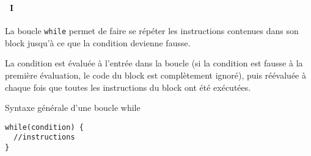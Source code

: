 \begin{frame}[containsverbatim]
  \frametitle{\secname}
  \framesubtitle{\subsecname~I}

  La boucle \verb|while| permet de faire se répéter les instructions contenues dans son block jusqu'à ce que la condition devienne fausse.
  \vspace{0.5cm}
  \par
  La condition est évaluée à l'entrée dans la boucle (si la condition est fausse à la première évaluation, le code du block est complètement ignoré), puis réévaluée
  à chaque fois que toutes les instructions du block ont été exécutées.
  \vspace{0.5cm}
  \begin{block}{Syntaxe générale d'une boucle while}
    \begin{verbatim}
while(condition) {
  //instructions
}\end{verbatim}
  \end{block}
\end{frame}


